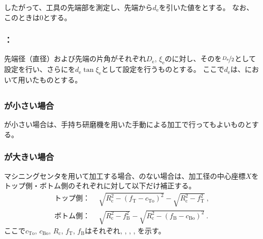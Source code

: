 したがって、工具の先端部を測定し、先端から$d_\mathrm e$を引いた値を\TLCValue とする。
なお、このとき\TLCWearValue は0とする。

\subsubsection{\indexTDCEndFaceCChamferMilling\nameTDCorrection：\EndFaceCChamferMilling}
先端径（直径）および先端の片角がそれぞれ$D_\mathrm e$, $\xi_\mathrm e$の\TaperEndMill に対し、その\TDCValue を$\nicefrac{D_\mathrm e}2$として設定を行い、さらに\TDCWearValue を$d_\mathrm e\tan\xi_\mathrm e$として設定を行うものとする。
ここで$d_\mathrm e$は、\nameTLCorrection において用いたものとする。


\subsection{\EndFaceOutCChamferMilling}

\subsubsection{\EndFaceCChamferLength が小さい場合}
\EndFaceOutCChamferLength が小さい場合は、手持ち研磨機を用いた手動による加工で行ってもよいものとする。

\subsubsection{\EndFaceCChamferLength が大きい場合}
マシニングセンタを用いて加工する場合、\Outcut のない場合は、加工径の中心座標$X$をトップ側・ボトム側のそれぞれに対して以下だけ補正する。
\begin{align*}
  \text{トップ側：}&~~
  \sqrt{R_\mathrm c^2-\left(f_\mathrm T-c_\mathrm{To}\right)^2}-\sqrt{R_\mathrm c^2-f_\mathrm T^2}\ ,\\
  \text{ボトム側：}&~~
  \sqrt{R_\mathrm c^2-f_\mathrm B^2}-\sqrt{R_\mathrm c^2-\left(f_\mathrm B-c_\mathrm{Bo}\right)^2}\ .
\end{align*}
ここで$c_\mathrm{To}$, $c_\mathrm{Bo}$, $R_\mathrm c$, $f_\mathrm T$, $f_\mathrm B$はそれぞれ\TopEndFaceOutCChamferLength, \BottomEndFaceOutCChamferLength, \CenterCurvatureRadius, \TopAlocationLength, \BottomAlocationLength を示す。



